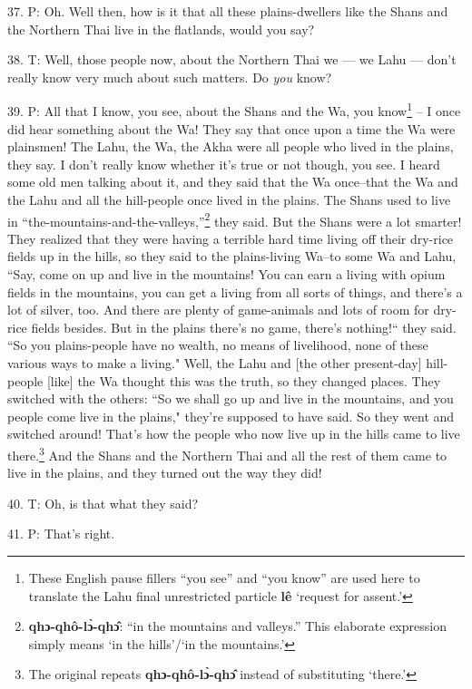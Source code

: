 37. P: Oh. Well then, how is it that all these plains-dwellers like the Shans and
the Northern Thai live in the flatlands, would you say?

38. T: Well, those people now, about the Northern Thai we --- we Lahu --- don't
really know very much about such matters. Do \textit{you} know?

39. P: All that I know, you see, about the Shans and the Wa, you know\footnote{These English pause fillers ``you see'' and ``you know'' are used here to translate the Lahu final unrestricted particle \textbf{lê} `request for assent.'} -- I once
did hear something about the Wa! They say that once upon a time the Wa were plainsmen!
The Lahu, the Wa, the Akha were all people who lived in the plains, they say. I
don't really know whether it's true or not though, you see. I heard some old men
talking about it, and they said that the Wa once--that the Wa and the Lahu and
all the hill-people once lived in the plains. The Shans used to live in ``the-mountains-and-the-valleys,''\footnote{\textbf{qhɔ-qhô-lɔ̀-qhɔ̂}: ``in the mountains and valleys.'' This elaborate expression simply means `in the hills'/`in the mountains.'}
they said. But the Shans were a lot smarter! They realized that they were having
a terrible hard time living off their dry-rice fields up in the hills, so they
said to the plains-living Wa--to some Wa and Lahu, ``Say, come on up and
live in the mountains! You can earn a living with opium fields in the mountains,
you can get a living from all sorts of things, and there's a lot of silver, too.
And there are plenty of game-animals and lots of room for dry-rice fields besides.
But in the plains there's no game, there's nothing!`` they said. ``So
you plains-people have no wealth, no means of livelihood, none of these various
ways to make a living." Well, the Lahu and [the other present-day] hill-people
[like] the Wa thought this was the truth, so they changed places. They switched
with the others: ``So we shall go up and live in the mountains, and you people
come live in the plains," they're supposed to have said. So they went
and switched around! That's how the people who now live up in the hills came to
live there.\footnote{The original repeats \textbf{qhɔ-qhô-lɔ̀-qhɔ̂} instead of substituting `there.'} And the Shans and the Northern Thai and all the rest of them came
to live in the plains, and they turned out the way they did!

40. T: Oh, is that what they said?

41. P: That's right.

